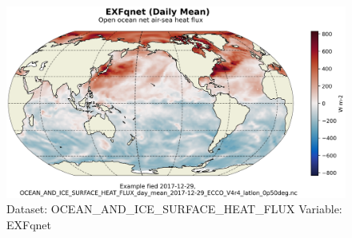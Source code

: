 \begin{figure}[H]
\centering
\includegraphics[scale=0.55]{../images/plots/latlon_plots/Ocean_and_Sea-Ice_Surface_Heat_Fluxes/EXFqnet.png}
\caption{Dataset: OCEAN\_AND\_ICE\_SURFACE\_HEAT\_FLUX Variable: EXFqnet}
\label{tab:table-OCEAN_AND_ICE_SURFACE_HEAT_FLUX_EXFqnet-Plot}
\end{figure}
\pagebreak
